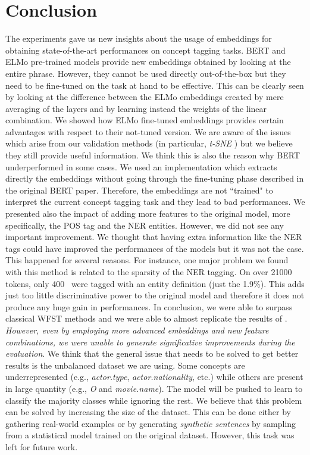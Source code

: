 \documentclass[11pt,a4paper]{article}
\begin{document}
\section{Conclusion}
The experiments gave us new insights about the usage of embeddings for obtaining state-of-the-art performances on concept tagging tasks. BERT and ELMo pre-trained models provide new embeddings obtained by looking at the entire phrase. However, they cannot be used directly out-of-the-box but they need to be fine-tuned on the task at hand to be effective. This can be clearly seen by looking at the difference between the ELMo embeddings created by mere averaging of the layers and by learning instead the weights of the linear combination. We showed how ELMo fine-tuned embeddings provides certain advantages with respect to their not-tuned version. We are aware of the issues which arise from our validation methods (in particular, \textit{t-SNE} \cite{wattenberg2016how}) but we believe they still provide useful information. We think this is also the reason why BERT underperformed in some cases. We used an implementation which extracts directly the embeddings without going through the fine-tuning phase described in the original BERT paper. Therefore, the embeddings are not ``trained" to interpret the current concept tagging task and they lead to bad performances.
We presented also the impact of adding more features to the original model, more specifically, the POS tag and the NER entities. However, we did not see any important improvement. We thought that having extra information like the NER tags could have improved the performances of the models but it was not the case. This happened for several reasons. For instance, one major problem we found with this method is related to the sparsity of the NER tagging. On over 21000 tokens, only 400~ were tagged with an entity definition (just the 1.9\%). This adds just too little discriminative power to the original model and therefore it does not produce any huge gain in performances.
In conclusion, we were able to surpass classical WFST methods and we were able to almost replicate the results of \citet{gobbi}. \textit{However, even by employing more advanced embeddings and new feature combinations, we were unable to generate significative improvements during the evaluation}.  
We think that the general issue that needs to be solved to get better results is the unbalanced dataset we are using. Some concepts are underrepresented (e.g., \textit{actor.type}, \textit{actor.nationality}, etc.) while others are present in large quantity (e.g., \textit{O} and \textit{movie.name}). The model will be pushed to learn to classify the majority classes while ignoring the rest. We believe that this problem can be solved by increasing the size of the dataset. This can be done either by gathering real-world examples or by generating \textit{synthetic sentences} by sampling from a statistical model trained on the original dataset. However, this task was left for future work.



\end{document}
